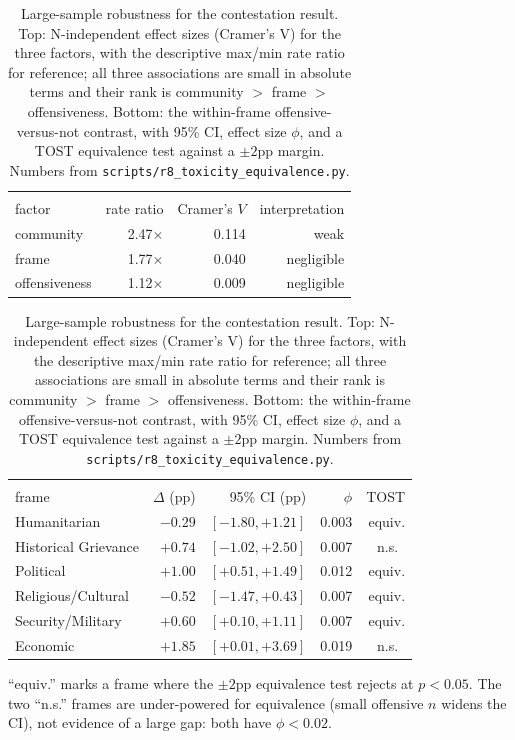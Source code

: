 \begin{table}[H]
\centering
\caption{Large-sample robustness for the contestation result. Top: N-independent
effect sizes (Cramer's V) for the three factors, with the descriptive max/min
rate ratio for reference; all three associations are small in absolute terms and
their rank is community $>$ frame $>$ offensiveness. Bottom: the within-frame
offensive-versus-not contrast, with 95\% CI, effect size $\phi$, and a TOST
equivalence test against a $\pm 2$pp margin. Numbers from
\texttt{scripts/r8\_toxicity\_equivalence.py}.}
\label{tab:r8equiv}
\setlength{\tabcolsep}{5pt}
\footnotesize
\begin{tabularx}{\linewidth}{@{}>{\raggedright\arraybackslash}Xrrr@{}}
\toprule
\multicolumn{4}{@{}l}{\emph{Effect sizes (contestation $\sim$ factor)}} \\
factor & rate ratio & Cramer's $V$ & interpretation \\
\midrule
community    & 2.47$\times$ & 0.114 & weak \\
frame        & 1.77$\times$ & 0.040 & negligible \\
offensiveness & 1.12$\times$ & 0.009 & negligible \\
\bottomrule
\end{tabularx}

\vspace{4pt}

\begin{tabularx}{\linewidth}{@{}>{\raggedright\arraybackslash}Xrrrr@{}}
\toprule
\multicolumn{5}{@{}l}{\emph{Within-frame offensive vs.\ not ($\Delta$ = offensive $-$ not)}} \\
frame & $\Delta$ (pp) & 95\% CI (pp) & $\phi$ & TOST \\
\midrule
Humanitarian         & $-0.29$ & $[-1.80, +1.21]$ & 0.003 & equiv. \\
Historical Grievance & $+0.74$ & $[-1.02, +2.50]$ & 0.007 & n.s.\ \\
Political            & $+1.00$ & $[+0.51, +1.49]$ & 0.012 & equiv. \\
Religious/Cultural   & $-0.52$ & $[-1.47, +0.43]$ & 0.007 & equiv. \\
Security/Military    & $+0.60$ & $[+0.10, +1.11]$ & 0.007 & equiv. \\
Economic             & $+1.85$ & $[+0.01, +3.69]$ & 0.019 & n.s.\ \\
\bottomrule
\end{tabularx}

\vspace{2pt}
{\footnotesize ``equiv.'' marks a frame where the $\pm 2$pp equivalence test
rejects at $p < 0.05$. The two ``n.s.'' frames are under-powered for equivalence
(small offensive $n$ widens the CI), not evidence of a large gap: both have
$\phi < 0.02$.}
\end{table}
